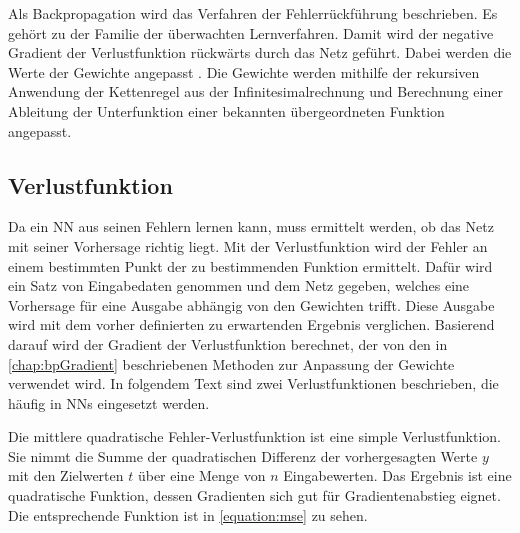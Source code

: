 Als Backpropagation wird das Verfahren der Fehlerrückführung beschrieben. Es gehört zu der Familie der überwachten Lernverfahren. Damit wird der negative Gradient der Verlustfunktion rückwärts durch das Netz geführt. Dabei werden die Werte der Gewichte angepasst \cite{Wythoff1993}. Die Gewichte werden mithilfe der rekursiven Anwendung der Kettenregel aus der Infinitesimalrechnung und Berechnung einer Ableitung der Unterfunktion einer bekannten übergeordneten Funktion angepasst.




\subsection{Verlustfunktion}

Da ein \ac{NN} aus seinen Fehlern lernen kann, muss ermittelt werden, ob das Netz mit seiner Vorhersage richtig liegt. Mit der Verlustfunktion wird der Fehler an einem bestimmten Punkt der zu bestimmenden Funktion ermittelt. Dafür wird ein Satz von Eingabedaten genommen und dem Netz gegeben, welches eine Vorhersage für eine Ausgabe abhängig von den Gewichten trifft. Diese Ausgabe wird mit dem vorher definierten zu erwartenden Ergebnis verglichen. Basierend darauf wird der Gradient der Verlustfunktion berechnet, der von den in \autoref{chap:bpGradient} beschriebenen Methoden zur Anpassung der Gewichte verwendet wird. In folgendem Text sind zwei Verlustfunktionen beschrieben, die häufig in \acp{NN} eingesetzt werden.

Die mittlere quadratische Fehler-Verlustfunktion ist eine simple Verlustfunktion. Sie nimmt die Summe der quadratischen Differenz der vorhergesagten Werte $y$ mit den Zielwerten $t$ über eine Menge von $n$ Eingabewerten. Das Ergebnis ist eine quadratische Funktion, dessen Gradienten sich gut für Gradientenabstieg eignet. Die entsprechende Funktion ist in \autoref{equation:mse} zu sehen.

